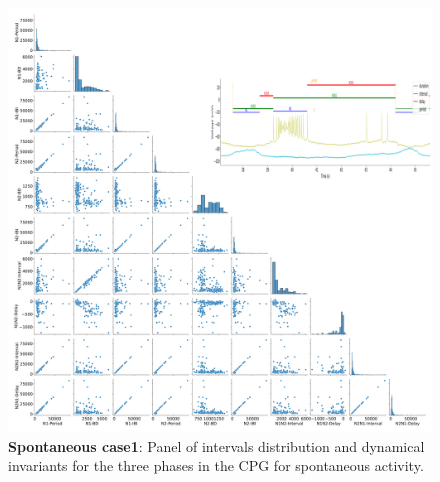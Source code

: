 \begin{figure}[htbp]
\begin{minipage}{\textwidth}
		\includegraphics[width=\textwidth]{./invariants/data/SUSSEX/prep1/images/spontaneous_2phases_pairplot_oneside_cycle.png}
	\end{minipage}
	\caption{\textbf{Spontaneous case1}: Panel of intervals distribution and dynamical invariants for the three phases in the CPG for spontaneous activity.}
	\label{fig:prep1 reduced panel}
\end{figure}


